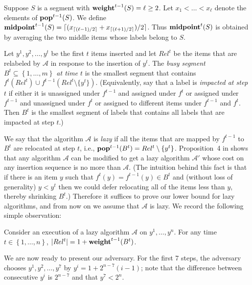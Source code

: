 \documentclass[unicode,review]{siamart1116}
\newcommand{\A}{\mathcal{A}}
\newcommand{\natInt}[2]{ \left\{ #1, \dotsc, #2 \right\} }
\newcommand{\pop}{{\rm {\bf pop}}}
\newcommand{\weight}{{\rm {\bf weight}}}
\newcommand{\midp}{{\rm {\bf midpoint}}}
\numberwithin{theorem}{section}
\providecommand{\DIFadd}[1]{{\protect\color{blue}\uwave{#1}}} %
\providecommand{\DIFdel}[1]{{\protect\color{red}\sout{#1}}}                      %
\providecommand{\DIFaddbegin}{} %
\providecommand{\DIFaddend}{} %
\providecommand{\DIFdelbegin}{} %
\providecommand{\DIFdelend}{} %
\newcommand{\DIFscaledelfig}{0.5}
\newlength{\DIFdelgraphicswidth} %
\newlength{\DIFdelgraphicsheight} %
\newcommand{\DIFaddincludegraphics}[2][]{{\color{blue}\fbox{\DIFOincludegraphics[#1]{#2}}}} %
\newcommand{\DIFdelincludegraphics}[2][]{%
\sbox{\DIFdelgraphicsbox}{\DIFOincludegraphics[#1]{#2}}%
\settoboxwidth{\DIFdelgraphicswidth}{\DIFdelgraphicsbox} %
\settoboxtotalheight{\DIFdelgraphicsheight}{\DIFdelgraphicsbox} %
\scalebox{\DIFscaledelfig}{%
\parbox[b]{\DIFdelgraphicswidth}{\usebox{\DIFdelgraphicsbox}\\[-\baselineskip] \rule{\DIFdelgraphicswidth}{0em}}\llap{\resizebox{\DIFdelgraphicswidth}{\DIFdelgraphicsheight}{%
\setlength{\unitlength}{\DIFdelgraphicswidth}%
\begin{picture}(1,1)%
\thicklines\linethickness{2pt} %
{\color[rgb]{1,0,0}\put(0,0){\framebox(1,1){}}}%
{\color[rgb]{1,0,0}\put(0,0){\line( 1,1){1}}}%
{\color[rgb]{1,0,0}\put(0,1){\line(1,-1){1}}}%
\end{picture}%
}\hspace*{3pt}}} %
} %
\DeclareRobustCommand{\DIFaddbegin}{\DIFOaddbegin \let\includegraphics\DIFaddincludegraphics} %
\DeclareRobustCommand{\DIFaddend}{\DIFOaddend \let\includegraphics\DIFOincludegraphics} %
\DeclareRobustCommand{\DIFdelbegin}{\DIFOdelbegin \let\includegraphics\DIFdelincludegraphics} %
\DeclareRobustCommand{\DIFdelend}{\DIFOaddend \let\includegraphics\DIFOincludegraphics} %
\begin{document}

Suppose $S$ is a segment with $\weight^{t-1}(S)=\ell \geq 2$.  Let $x_1< \ldots < x_\ell$ denote the elements
of $\pop^{t-1}(S)$.  We define $\midp^{t-1}(S)= \lceil (x_{\lceil (\ell-1)/2 \rceil} + x_{\lceil (\ell+1)/2 \rceil} )/ 2 \rceil$. Thus \DIFdelbegin \DIFdel{$\midp^t(S)$ }\DIFdelend \DIFaddbegin \DIFadd{$\midp^{t-1}(S)$ }\DIFaddend is obtained by averaging the two middle items whose labels belong to  $S$. 

Let $y^1,y^2,\dotsc,y^t$ be the first $t$ items inserted  and let $Rel^t$ be the items
that are relabeled by
$\A$ in response to the insertion of $y^t$. The \emph{busy segment $B^t\subseteq \natInt{1}{m}$ at time $t$} is
the smallest segment that contains $f^t(Rel^t)\cup f^{t-1}(Rel^t \setminus \{y^t\})$. \DIFaddbegin \DIFadd{(As usual, $f(A) = \{f(x) : x \in A\}.$)
}\DIFaddend %
 (Equivalently, say that a label
is {\em  impacted at step $t$} if either it is unassigned under $f^{t-1}$ and assigned under $f^t$ or assigned under
$f^{t-1}$ and unassigned under $f^t$ or assigned to different items under $f^{t-1}$ and $f^t$. Then $B^t$ is
the smallest segment  of labels that contains all labels that are impacted at step $t$.)

We say
 that the algorithm $\A$ is \emph{lazy} if
all the items that are mapped by $f^{t-1}$ to $B^t$ are relocated at step $t$, i.e., $\pop^{t-1}(B^t) = Rel^t \setminus \{y^t\}$.
Proposition~4 in \cite{BKS} shows that any algorithm $\A$ can be modified to get a lazy algorithm $\A'$
whose cost on any insertion sequence is no more than $\A$. 
(The intuition behind this fact is that if there is an item $y$
such that $f^t(y)=f^{t-1}(y) \in B^t$ and (without loss of generality) $y<y^t$ then we could defer relocating
all of the items less than $y$, thereby shrinking $B^t$.)
Therefore it suffices to prove our lower bound
for lazy algorithms, and from now on we assume that  $\A$ is lazy.
We record the following simple observation:

\begin{proposition}
\label{l-busy}
Consider an execution of a lazy algorithm $\A$ on $y^1,\ldots,y^n$.  
For any
time $t\in \natInt{1}{n}$, $|Rel^t|=1+\weight^{t-1}(B^t)$.
\end{proposition}



We are now ready to present our adversary.   For the first 7 steps, the adversary chooses
$y^1,y^2,\ldots,y^7$ by $y^i=1+2^{n-7}(i-1)$; note
that the difference between consecutive $y^i$ is $2^{n-7}$ and that $y^7 < 2^n$.
\end{document}
